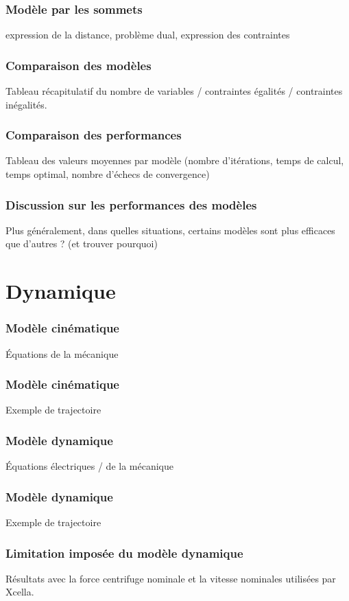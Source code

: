 \documentclass{beamer}
\begin{document}
	\begin{frame}
		\frametitle{Modèle par les sommets}
		expression de la distance, problème dual, expression des contraintes
	\end{frame}
	
	\begin{frame}
		\frametitle{Comparaison des modèles}
		Tableau récapitulatif du nombre de variables / contraintes égalités / contraintes inégalités.
	\end{frame}
	
	\begin{frame}
		\frametitle{Comparaison des performances}
		Tableau des valeurs moyennes par modèle (nombre d'itérations, temps de calcul, temps optimal, nombre d'échecs de convergence)
	\end{frame}
	
	\begin{frame}
		\frametitle{Discussion sur les performances des modèles}
		Plus généralement, dans quelles situations, certains modèles sont plus efficaces que d'autres ? (et trouver pourquoi)
	\end{frame}
	
	
	
	\section{Dynamique}
	
	\begin{frame}
		\frametitle{Modèle cinématique}
		Équations de la mécanique
	\end{frame}
	
	\begin{frame}
		\frametitle{Modèle cinématique}
		Exemple de trajectoire
	\end{frame}
	
	\begin{frame}
		\frametitle{Modèle dynamique}
		Équations électriques / de la mécanique
	\end{frame}
	
	\begin{frame}
		\frametitle{Modèle dynamique}
		Exemple de trajectoire
	\end{frame}
	
	\begin{frame}
		\frametitle{Limitation imposée du modèle dynamique}
		Résultats avec la force centrifuge nominale et la vitesse nominales utilisées par Xcella.
	\end{frame}
	
\end{document}
